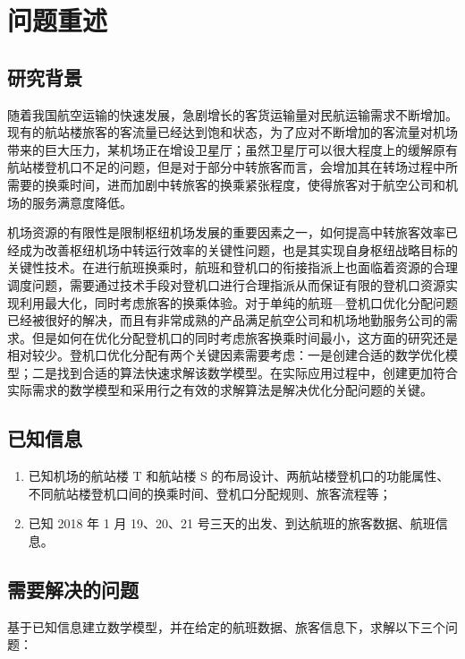 \documentclass[bwprint]{gmcmthesis}
\numberwithin{figure}{section}
\begin{document}

\tableofcontents

\newpage
\section{问题重述}
\subsection{研究背景}
随着我国航空运输的快速发展，急剧增长的客货运输量对民航运输需求不断增加。现有的航站楼旅客的客流量已经达到饱和状态，为了应对不断增加的客流量对机场带来的巨大压力，某机场正在增设卫星厅；虽然卫星厅可以很大程度上的缓解原有航站楼登机口不足的问题，但是对于部分中转旅客而言，会增加其在转场过程中所需要的换乘时间，进而加剧中转旅客的换乘紧张程度，使得旅客对于航空公司和机场的服务满意度降低。

机场资源的有限性是限制枢纽机场发展的重要因素之一，如何提高中转旅客效率已经成为改善枢纽机场中转运行效率的关键性问题，也是其实现自身枢纽战略目标的关键性技术\cite{bouras2014airport, marinelli2015metaheuristic}。在进行航班换乘时，航班和登机口的衔接指派上也面临着资源的合理调度问题，需要通过技术手段对登机口进行合理指派从而保证有限的登机口资源实现利用最大化，同时考虑旅客的换乘体验\cite{zhang2017multi}。对于单纯的航班—登机口优化分配问题已经被很好的解决，而且有非常成熟的产品满足航空公司和机场地勤服务公司的需求。但是如何在优化分配登机口的同时考虑旅客换乘时间最小，这方面的研究还是相对较少。登机口优化分配有两个关键因素需要考虑：一是创建合适的数学优化模型；二是找到合适的算法快速求解该数学模型。在实际应用过程中，创建更加符合实际需求的数学模型和采用行之有效的求解算法是解决优化分配问题的关键。
\subsection{已知信息}
\begin{enumerate}[label={(\arabic*)}]
\item 
已知机场的航站楼 T 和航站楼 S 的布局设计、两航站楼登机口的功能属性、不同航站楼登机口间的换乘时间、登机口分配规则、旅客流程等；
\item
已知 2018 年 1 月 19、20、21 号三天的出发、到达航班的旅客数据、航班信息。
\end{enumerate}
\subsection{需要解决的问题}
基于已知信息建立数学模型，并在给定的航班数据、旅客信息下，求解以下三个问题：
\end{document}
